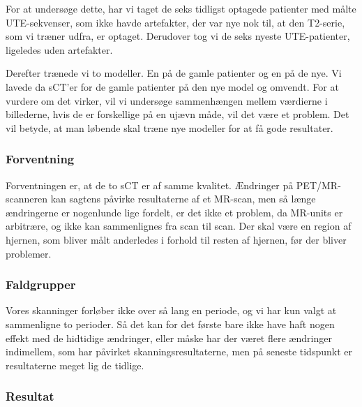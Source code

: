 For at undersøge dette, har vi taget de seks
tidligst optagede patienter med målte UTE-sekvenser, som ikke havde artefakter, der
var nye nok til, at den T2-serie, som vi træner udfra, er optaget.
Derudover tog vi de seks nyeste UTE-patienter, ligeledes uden artefakter.

Derefter trænede vi to modeller. En på de gamle patienter og en på de
nye. Vi lavede da sCT'er for de gamle patienter på den nye model og
omvendt. For at vurdere om det virker, vil vi undersøge sammenhængen mellem værdierne i billederne, hvis de er forskellige på en ujævn måde, vil det være et problem. Det vil betyde, at man løbende skal træne nye modeller for at få gode resultater.

\subsubsection{Forventning}

Forventningen er, at de to sCT er af samme kvalitet.
Ændringer på PET/MR-scanneren kan sagtens påvirke resultaterne af et MR-scan, men så længe ændringerne er nogenlunde lige fordelt, er det ikke
et problem, da MR-units er arbitrære, og ikke kan sammenlignes fra scan til
scan. Der skal være en region af hjernen, som bliver målt anderledes i
forhold til resten af hjernen, før der bliver problemer.

\subsubsection{Faldgrupper}

Vores skanninger forløber ikke over så lang en periode, og vi har
kun valgt at sammenligne to perioder. Så det kan for det første
bare ikke have haft nogen effekt med de hidtidige ændringer, eller
måske har der været flere ændringer indimellem, som har påvirket
skanningsresultaterne, men på seneste tidspunkt er resultaterne meget
lig de tidlige.

\subsubsection{Resultat}

